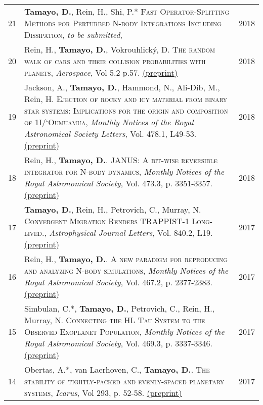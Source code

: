\documentclass[10pt]{article} %
\begin{document}
\begin{tabular}{>{\hfill}r|p{14.3cm}l}

21 & {\bf Tamayo, D.}, Rein, H., Shi, P.* \textsc{Fast Operator-Splitting Methods for Perturbed N-body Integrations Including Dissipation}, {\it to be submitted}, & 2018 \\

20 & Rein, H., {\bf Tamayo, D.}, Vokrouhlick\'{y}, D. \textsc{The random walk of cars and their collision probabilities with planets}, {\it Aerospace}, Vol 5.2 p.57.  \href{https://arxiv.org/abs/1802.04718}{(preprint)} & 2018 \\

19 & Jackson, A., {\bf Tamayo, D.}, Hammond, N., Ali-Dib, M., Rein, H. \textsc{Ejection of rocky and icy material from binary star systems: Implications for the origin and composition of 1I/`Oumuamua}, {\it Monthly Notices of the Royal Astronomical Society Letters}, Vol. 478.1, L49-53. \href{https://arxiv.org/abs/1712.04435}{(preprint)} & 2018 \\

18 & Rein, H., {\bf Tamayo, D.}. \textsc{JANUS: A bit-wise reversible integrator for N-body dynamics}, {\it Monthly Notices of the Royal Astronomical Society}, Vol. 473.3, p. 3351-3357. \href{https://arxiv.org/abs/1704.07715}{(preprint)} & 2018 \\

17 & {\bf Tamayo, D.}, Rein, H., Petrovich, C., Murray, N. \textsc{Convergent Migration Renders TRAPPIST-1 Long-lived.}, {\it Astrophysical Journal Letters}, Vol. 840.2, L19. \href{https://arxiv.org/abs/1704.02957}{(preprint)} & 2017 \\

16 & Rein, H., {\bf Tamayo, D.}. \textsc{A new paradigm for reproducing and analyzing N-body simulations}, {\it Monthly Notices of the Royal Astronomical Society}, Vol. 467.2, p. 2377-2383. \href{https://arxiv.org/abs/1701.07423}{(preprint)} & 2017 \\

15 & Simbulan, C.*, {\bf Tamayo, D.}, Petrovich, C., Rein, H., Murray, N. \textsc{Connecting the HL Tau System to the Observed Exoplanet Population}, {\it Monthly Notices of the Royal Astronomical Society}, Vol. 469.3, p. 3337-3346. \href{https://arxiv.org/abs/1703.09132}{(preprint)} & 2017 \\

14 & Obertas, A.*, van Laerhoven, C., {\bf Tamayo, D.}. \textsc{The stability of tightly-packed and evenly-spaced planetary systems}, {\it Icarus}, Vol 293, p. 52-58. \href{https://arxiv.org/abs/1703.08426}{(preprint)} & 2017 \\


\end{tabular}
\end{document}

